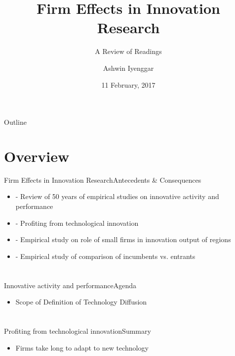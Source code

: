 \documentclass{beamer}
\title{Firm Effects in Innovation Research}
\subtitle{A Review of Readings}
\author{Ashwin Iyenggar}
\institute[Indian Institute of Management Bangalore] 
{
  Corporate Strategy and Policy\\
  Indian Institute of Management Bangalore
}
\date{11 February, 2017}
\begin{document}
\begin{frame}
  \titlepage
\end{frame}

\begin{frame}{Outline}
  \tableofcontents
\end{frame}

\section{Overview}
\begin{frame}{Firm Effects in Innovation Research}{Antecedents \& Consequences}
\begin{itemize}
\item{\cite{Cohen2010} - Review of 50 years of empirical studies on innovative activity and performance}
\item{\cite{Teece1986} - Profiting from technological innovation}
\item{\cite{Agrawal2014} - Empirical study on role of small firms in innovation output of regions}
\item{\cite{igami2015} - Empirical study of comparison of incumbents vs. entrants}
\end{itemize}
\end{frame}



\section{\cite{Cohen2010}}
\begin{frame}{Innovative activity and performance}{Agenda}
\begin{itemize}
\item{Scope of Definition of Technology Diffusion}
\end{itemize}
\end{frame}



\section{\cite{Teece1986}}
\begin{frame}{Profiting from technological innovation}{Summary}
\begin{itemize}
\item{Firms take long to adapt to new technology}
\end{itemize}
\end{frame}
\end{document}
